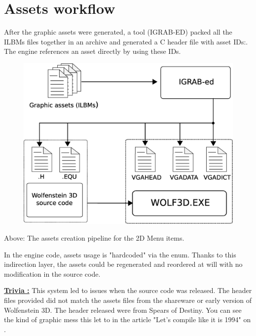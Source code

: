 \documentclass[book.tex]{subfiles}
\begin{document}
\section{Assets workflow}
After the graphic assets were generated, a tool (IGRAB-ED) packed all the ILBMs files together in an archive and generated a C header file with asset IDs:. The engine references an asset directly by using these IDs.\\
\begin{figure}[H]
\centering
 \includegraphics[width=\textwidth]{imgs/drawings/drawing_plain.eps}
\end{figure}
Above: The assets creation pipeline for the 2D Menu items.\\
\par
\begin{minipage}{\textwidth}
 \par
 \end{minipage}
 
 In the engine code, assets usage is "hardcoded" via the enum. Thanks to this indirection layer, the assets could be regenerated and reordered at will with no modification in the source code.\\
 \par
 \begin{minipage}{\textwidth}
 \par
 \end{minipage}
\par
\textbf{\underline{Trivia :}} This system led to issues when the source code was released. The  header files provided did not match the assets files from the shareware or early version of Wolfenstein 3D. The header released were from Spears of Destiny. You can see the kind of graphic mess this let to in the article "Let's compile like it is 1994" on .\\
\end{document}
